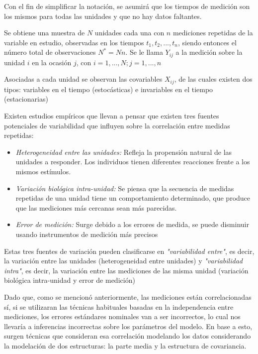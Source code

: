 \documentclass[12pt]{article}
\begin{document}
Con el fin de simplificar la notación, se asumirá que los tiempos de medición son los mismos para todas las unidades y
que no hay datos faltantes.

Se obtiene una muestra de $N$ unidades cada una con $n$ mediciones repetidas de la variable en estudio, observadas en los
tiempos $t_1, t_2, ..., t_n$, siendo entonces el número total de observaciones $N^*=Nn$. Se le llama $Y_{ij}$ a la
medición sobre la unidad $i$ en la ocasión $j$, con $i=1, ..., N; j=1, ..., n$

Asociadas a cada unidad se observan las covariables $X_{ij}$, de las cuales existen dos tipos: variables en el tiempo
(estocásticas) e invariables en el tiempo (estacionarias)

Existen estudios empíricos que llevan a pensar que existen tres fuentes potenciales de variabilidad que influyen
sobre la correlación entre medidas repetidas:

\begin{itemize}
	\item \emph{Heterogeneidad entre las unidades:} Refleja la propensión natural de las unidades a responder.
	Los individuos tienen diferentes reacciones frente a los mismos estímulos.
	\item \emph{Variación biológica intra-unidad:} Se piensa que la secuencia de medidas repetidas de una unidad tiene
	un comportamiento determinado, que produce que las mediciones más cercanas sean más parecidas.
	\item \emph{Error de medición:} Surge debido a los errores de medida, se puede disminuir usando instrumentos
	de medición más precisos
\end{itemize}

Estas tres fuentes de variación pueden clasificarse en \emph{"variabilidad entre"}, es decir, la variación entre
las unidades (heterogeneidad entre unidades) y \emph{"variabilidad intra"}, es decir, la variación entre las mediciones
de las misma unidad (variación biológica intra-unidad y error de medición)

Dado que, como se mencionó anteriormente, las mediciones están correlacionadas sí, si se utilizaran las técnicas habituales
basadas en la independencia entre mediciones, los errores estándares nominales van a ser incorrectos, lo cual nos llevaría
a inferencias incorrectas sobre los parámetros del modelo. En base a esto, surgen técnicas que consideran esa correlación
modelando los datos considerando la modelación de dos estructuras: la parte media y la estructura de covariancia.
\end{document}
